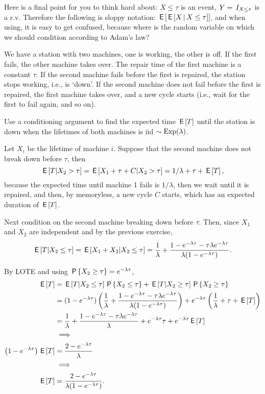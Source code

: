 \begin{exercise}
\begin{solution}
Here is a final point for you to think hard about: ${X\leq \tau}$ is an event, $Y=\1{X \leq \tau}$ is a r.v. Therefore the following is sloppy notation: $\E{\E{X\given X\leq \tau}}$, and when using, it is easy to get confused, because where is the random variable  on which we  should condition according to Adam's law?
\end{solution}
\end{exercise}


\begin{exercise}
We have a station with two machines, one is working, the other is off.
If the first fails, the other machine takes over.
The repair time of the first machine is a constant $\tau$.
If the second machine fails before the first is repaired, the station stops working, i.e., is `down'. If the second machine does not fail before the first is repaired, the first machine takes over, and a new cycle starts (i.e., wait for the first to fail again, and so on).

Use a conditioning argument to find the expected time $\E T$ until the station is down when the lifetimes of both machines is iid $\sim\Exp{\lambda}$.
\begin{solution}
Let $X_i$ be the lifetime of machine $i$. Suppose that  the second machine does not break down before $\tau$, then
\begin{equation}
\E{T| X_{2}>\tau} = \E{X_{1} + \tau + C |X_2>\tau} = 1/\lambda + \tau + \E T,
\end{equation}
because the expected time until machine 1 fails is $1/\lambda$, then we wait until it is repaired, and then, by memoryless, a new cycle $C$ starts, which has an expected duration of $\E T$.

Next condition on the second machine breaking down before $\tau$. Then, since $X_{1}$ and $X_2$ are independent and by the previous exercise,
\begin{equation}
\E{T| X_{2}\leq \tau} = \E{X_{1} + X_{2}  |X_2\leq \tau} = \frac{1}{\lambda} + \frac{ 1- e^{-\lambda \tau}- \tau \lambda  e^{-\lambda \tau}}{\lambda(1-e^{-\lambda \tau})}.
\end{equation}

By LOTE and using $\P{X_{2}\geq \tau} = e^{-\lambda \tau}$,
\begin{align}
  \label{eq:924}
\E T
&=
\E{T| X_{2}\leq \tau} \P{X_{2}\leq \tau} + \E{T| X_{2}\geq \tau} \P{X_{2}\geq \tau} \\
&=(1-e^{-\lambda \tau})\left( \frac 1\lambda+
\frac{ 1- e^{-\lambda \tau}- \tau \lambda  e^{-\lambda \tau}}{\lambda(1-e^{-\lambda \tau})} \right)
+e^{-\lambda \tau}\left( \frac{1}{\lambda} + \tau + \E T \right) \\
&=\frac{1}{\lambda} + \frac{ 1- e^{-\lambda \tau}- \tau \lambda  e^{-\lambda \tau}}{\lambda}
+e^{-\lambda \tau} \tau + e^{-\lambda \tau}\E T \\
&\implies \\
\left( 1-e^{-\lambda \tau} \right) \E T
&=\frac{2-e^{-\lambda \tau}}{\lambda} \\
&\implies \\
\E T
&=\frac{2-e^{-\lambda \tau}}{\lambda(1-e^{-\lambda \tau})}.
\end{align}


\end{solution}
\end{exercise}
